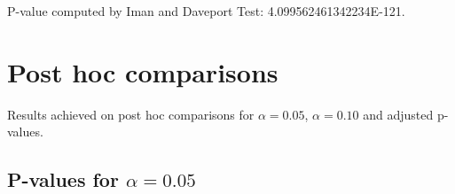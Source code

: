 \documentclass[a4paper,10pt]{article}
\begin{document}
\begin{landscape}
P-value computed by Iman and Daveport Test: 4.099562461342234E-121.\newline



\pagebreak

\section{Post hoc comparisons}

Results achieved on post hoc comparisons for $\alpha = 0.05$, $\alpha = 0.10$ and adjusted p-values.

\subsection{P-values for $\alpha=0.05$}


\end{landscape}
\end{document}
